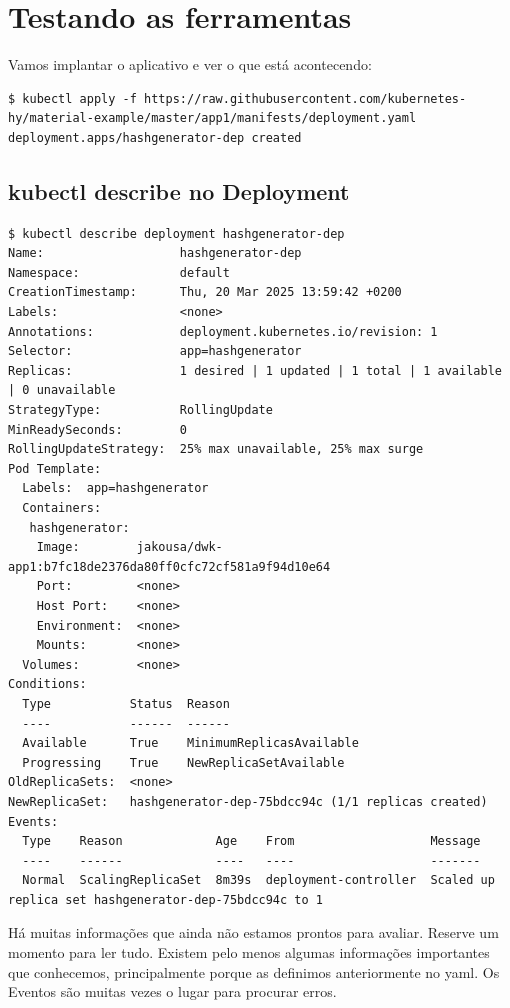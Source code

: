 \documentclass[11pt,a4paper]{article}
\begin{document}
\section{Testando as ferramentas}

Vamos implantar o aplicativo e ver o que está acontecendo:

\begin{verbatim}
$ kubectl apply -f https://raw.githubusercontent.com/kubernetes-hy/material-example/master/app1/manifests/deployment.yaml
deployment.apps/hashgenerator-dep created
\end{verbatim}

\subsection{kubectl describe no Deployment}

\begin{verbatim}
$ kubectl describe deployment hashgenerator-dep
Name:                   hashgenerator-dep
Namespace:              default
CreationTimestamp:      Thu, 20 Mar 2025 13:59:42 +0200
Labels:                 <none>
Annotations:            deployment.kubernetes.io/revision: 1
Selector:               app=hashgenerator
Replicas:               1 desired | 1 updated | 1 total | 1 available | 0 unavailable
StrategyType:           RollingUpdate
MinReadySeconds:        0
RollingUpdateStrategy:  25% max unavailable, 25% max surge
Pod Template:
  Labels:  app=hashgenerator
  Containers:
   hashgenerator:
    Image:        jakousa/dwk-app1:b7fc18de2376da80ff0cfc72cf581a9f94d10e64
    Port:         <none>
    Host Port:    <none>
    Environment:  <none>
    Mounts:       <none>
  Volumes:        <none>
Conditions:
  Type           Status  Reason
  ----           ------  ------
  Available      True    MinimumReplicasAvailable
  Progressing    True    NewReplicaSetAvailable
OldReplicaSets:  <none>
NewReplicaSet:   hashgenerator-dep-75bdcc94c (1/1 replicas created)
Events:
  Type    Reason             Age    From                   Message
  ----    ------             ----   ----                   -------
  Normal  ScalingReplicaSet  8m39s  deployment-controller  Scaled up replica set hashgenerator-dep-75bdcc94c to 1
\end{verbatim}

Há muitas informações que ainda não estamos prontos para avaliar. Reserve um momento para ler tudo. Existem pelo menos algumas informações importantes que conhecemos, principalmente porque as definimos anteriormente no yaml. Os Eventos são muitas vezes o lugar para procurar erros.
\end{document}

